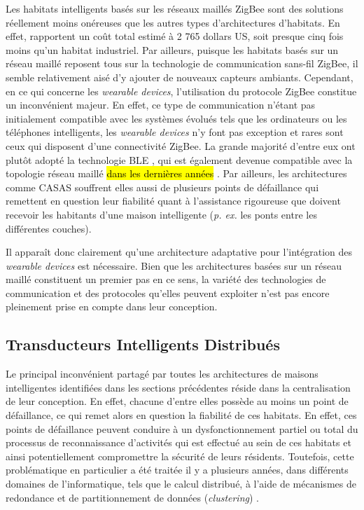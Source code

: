 Les habitats intelligents basés sur les réseaux maillés ZigBee sont des solutions réellement moins onéreuses que les autres types d'architectures d'habitats. En effet, \cite{Cook2013} rapportent un coût total estimé à 2 765 dollars US, soit presque cinq fois moins qu'un habitat industriel. Par ailleurs, puisque les habitats basés sur un réseau maillé reposent tous sur la technologie de communication sans-fil ZigBee, il semble relativement aisé d'y ajouter de nouveaux capteurs ambiants. Cependant, en ce qui concerne les \textit{wearable devices}, l'utilisation du protocole ZigBee constitue un inconvénient majeur. En effet, ce type de communication n'étant pas initialement compatible avec les systèmes évolués tels que les ordinateurs ou les téléphones intelligents, les \textit{wearable devices} n'y font pas exception et rares sont ceux qui disposent d'une connectivité ZigBee. La grande majorité d'entre eux ont plutôt adopté la technologie \ac{BLE} \citep{Martin2014}, qui est également devenue compatible avec la topologie réseau maillé \hl{dans les dernières années} \citep{Bluetooth2017}. Par ailleurs, les architectures comme CASAS souffrent elles aussi de plusieurs points de défaillance qui remettent en question leur fiabilité quant à l'assistance rigoureuse que doivent recevoir les habitants d'une maison intelligente (\textit{p. ex.} les ponts entre les différentes couches).

Il apparaît donc clairement qu'une architecture adaptative pour l'intégration des \textit{wearable devices} est nécessaire. Bien que les architectures basées sur un réseau maillé constituent un premier pas en ce sens, la variété des technologies de communication et des protocoles qu'elles peuvent exploiter n'est pas encore pleinement prise en compte dans leur conception.

\subsection{Transducteurs Intelligents Distribués}

Le principal inconvénient partagé par toutes les architectures de maisons intelligentes identifiées dans les sections précédentes réside dans la centralisation de leur conception. En effet, chacune d'entre elles possède au moins un point de défaillance, ce qui remet alors en question la fiabilité de ces habitats. En effet, ces points de défaillance peuvent conduire à un dysfonctionnement partiel ou total du processus de reconnaissance d'activités qui est effectué au sein de ces habitats et ainsi potentiellement compromettre la sécurité de leurs résidents. Toutefois, cette problématique en particulier a été traitée il y a plusieurs années, dans différents domaines de l'informatique, tels que le calcul distribué, à l'aide de mécanismes de redondance et de partitionnement de données (\textit{clustering}) \citep{Dikaiakos2009,Zaharia2010,JafarnejadGhomi2017}.

